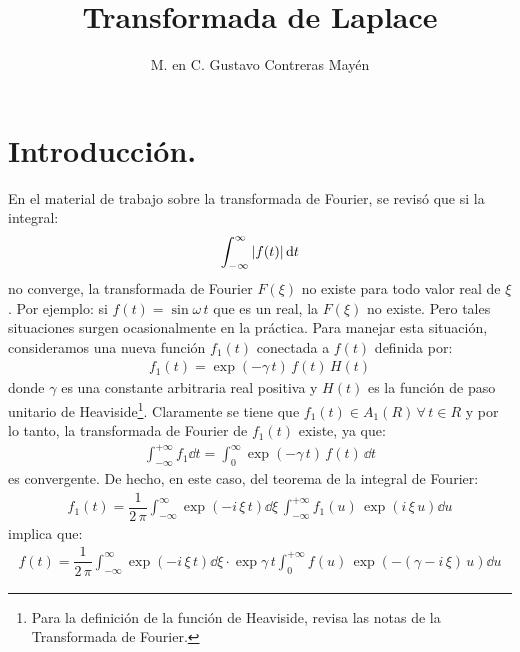 
\title{Transformada de Laplace} \vspace{-3ex}
\author{M. en C. Gustavo Contreras Mayén}
\date{ }
\newcommand{\Cancel}[2][black]{{\color{#1}\cancel{\color{black}#2}}}

\vspace{-4cm}
\maketitle
\fontsize{14}{14}\selectfont
\tableofcontents
\newpage

\section{Introducción.}

En el material de trabajo sobre la transformada de Fourier, se revisó que si la integral:
\begin{align*}
\int_{-\infty}^{\infty} \abs{f(t)} \dd{t}
\end{align*}
no converge, la transformada de Fourier $F(\xi)$ no existe para todo valor real de $\xi$. Por ejemplo: si $f(t) = \sin \omega \, t$ que es un real, la $F(\xi)$ no existe. Pero tales situaciones surgen ocasionalmente en la práctica. Para manejar esta situación, consideramos una nueva función $f_{1} (t)$ conectada a $f (t)$ definida por:
\begin{align*}
f_{1}(t) =  \exp(- \gamma \, t) \, f(t) \, H(t)
\end{align*}
donde $\gamma$ es una constante arbitraria real positiva y $H(t)$ es la función de paso unitario de Heaviside\footnote{Para la definición de la función de Heaviside, revisa las notas de la Transformada de Fourier.}. Claramente se tiene que $f_{1}(t) \in A_{1}(R) \, \forall \, t \in R$ y por lo tanto, la transformada de Fourier de $f_{1}(t)$ existe, ya que:
\begin{align*}
\int_{-\infty}^{+\infty} f_{1} \dd{t} = \int_{0}^{\infty} \exp(-\gamma \, t) \, f(t) \, \dd{t}
\end{align*}
es convergente. De hecho, en este caso, del teorema de la integral de Fourier:
\begin{align*}
f_{1} (t) = \dfrac{1}{2 \, \pi} \int_{-\infty}^{\infty} \exp(-i \, \xi \, t) \dd{\xi} \, \int_{-\infty}^{+\infty} f_{1}(u) \, \exp(i \, \xi \, u) \dd{u}
\end{align*}
implica que:
\begin{align*}
f (t) = \dfrac{1}{2 \, \pi} \int_{-\infty}^{\infty} \exp(-i \, \xi \, t) \dd{\xi} \cdot \exp{\gamma \, t} \int_{0}^{+\infty} f(u) \, \exp(- (\gamma - i \, \xi) \, u) \dd{u}
\end{align*}

